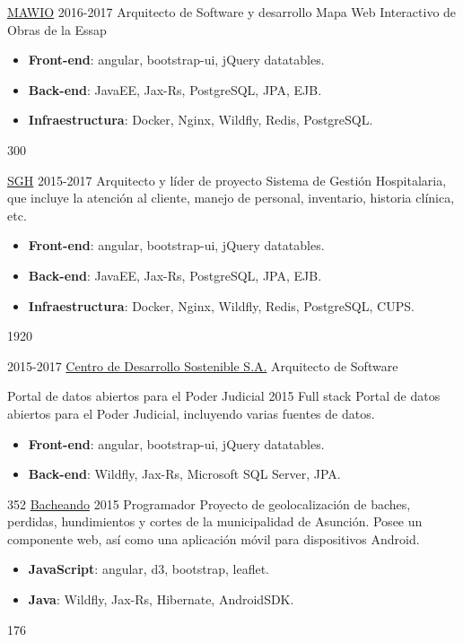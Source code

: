 \documentclass[]{friggeri-cv}
\begin{document}
\begin{entrylist}
{    \proyecto
        {\href{https://mawio.net/}{MAWIO}}
        {2016-2017}
        {Arquitecto de Software y desarrollo}
        {Mapa Web Interactivo de Obras de la Essap}
        {\begin{itemize}
            \item \textbf{Front-end}: angular, bootstrap-ui, jQuery datatables.
            \item \textbf{Back-end}: JavaEE, Jax-Rs, PostgreSQL, JPA, EJB.
            \item \textbf{Infraestructura}: Docker, Nginx, Wildfly, Redis, PostgreSQL.
        \end{itemize}}
        {300}
        
    \proyecto
        {\href{http://www.cds.com.py/productos/sistemas-de-gestion/sistema-de-gestion-hospitalaria/}{SGH}}
        {2015-2017}
        {Arquitecto y líder de proyecto}
        {Sistema de Gestión Hospitalaria, que incluye la atención 
        	al cliente, manejo de personal, inventario, historia clínica, etc.}
        {\begin{itemize}
            \item \textbf{Front-end}: angular, bootstrap-ui, jQuery datatables.
            \item \textbf{Back-end}: JavaEE, Jax-Rs, PostgreSQL, JPA, EJB.
            \item \textbf{Infraestructura}: Docker, Nginx, Wildfly, Redis, PostgreSQL, CUPS.
        \end{itemize}}
        {1920}
      }
      {}
    
  \entry
    {2015-2017}
    {\href{http://www.cds.com.py}{Centro de Desarrollo Sostenible S.A.}}
    {Arquitecto de Software}
    {
        
    \proyecto
        {Portal de datos abiertos para el Poder Judicial}
        {2015}
        {Full stack}
        {Portal de datos abiertos para el Poder Judicial, incluyendo varias
        	fuentes de datos.}
        {\begin{itemize}
            \item \textbf{Front-end}: angular, bootstrap-ui, jQuery datatables.
            \item \textbf{Back-end}: Wildfly, Jax-Rs, Microsoft SQL Server, JPA.
        \end{itemize}}
        {352} 
    \proyecto
        {\href{http://bacheando.com/}{Bacheando}}
        {2015}
        {Programador}
        {Proyecto de geolocalización de baches, perdidas, hundimientos y
            cortes de la municipalidad de Asunción.
            Posee un componente web, así como una aplicación móvil para
            dispositivos Android.}
        {\begin{itemize}
            \item \textbf{JavaScript}: angular, d3, bootstrap, leaflet.
            \item \textbf{Java}: Wildfly, Jax-Rs, Hibernate, AndroidSDK.
        \end{itemize}}
        {176} 
        
}
\end{entrylist}
\end{document}

